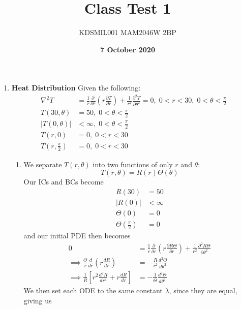 \documentclass[12pt]{article}
\title{Class Test 1}
\author{KDSMIL001 \; MAM2046W 2BP}
\date{\textbf{7 October 2020}}
\numberwithin{equation}{section}
\begin{document}
    \maketitle
    \begin{enumerate}
        \item \textbf{Heat Distribution}\newline
        Given the following:
        \begin{align*}
            \nabla^2 T&=\frac{1}{r}\frac{\partial }{\partial r}\left(r\frac{\partial T}{\partial r}\right)+\frac{1}{r^2}\frac{\partial^2 T}{\partial \theta^2}=0,\;0<r<30,\;0<\theta<\frac{\pi}{2}\\
            T(30,\theta)&=50,\;0<\theta<\frac{\pi}{2}\\
            |T(0,\theta)|&<\infty,\;0<\theta<\frac{\pi}{2}\\
            T(r,0)&=0,\;0<r<30\\
            T(r,\frac{\pi}{2})&=0,\;0<r<30
        \end{align*}
        \begin{enumerate}
            \item We separate $T(r,\theta)$ into two functions of only $r$ and $\theta$:
            \begin{equation*}
                T(r,\theta)=R(r)\Theta(\theta)
            \end{equation*}
            Our ICs and BCs become
            \begin{align*}
                R(30)&=50\\
                |R(0)|&<\infty\\
                \Theta(0)&=0\\
                \Theta(\frac{\pi}{2})&=0
            \end{align*}
            and our initial PDE then becomes
            \begin{align*}
                0&=\frac{1}{r}\frac{\partial }{\partial r}\left(r\frac{\partial R\Theta}{\partial r}\right)+\frac{1}{r^2}\frac{\partial^2 R\Theta}{\partial \theta^2}\\
                \implies \frac{\Theta}{r}\frac{d}{d r}\left(r\frac{d R}{d r}\right)&=-\frac{R}{r^2}\frac{d^2 \Theta}{d \theta^2}\\
                \implies \frac{1}{R}\left[r^2\frac{d^2R}{dr^2}+r\frac{dR}{dr}\right]&=-\frac{1}{\Theta}\frac{d^2 \Theta}{d\theta^2}
            \end{align*}
            We then set each ODE to the same constant $\lambda$, since they are equal, giving us 

\end{enumerate}
\end{enumerate}
\end{document}
